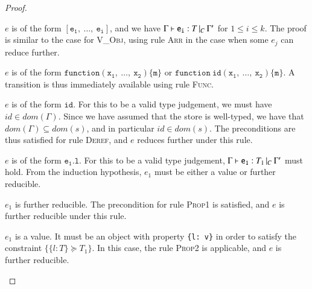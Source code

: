 \begin{proof}
  \begin{case}[V\_Arr]\label{case:prog-v_arr}

	$e$ is of the form $\mathtt{[e_1,\ \dots,\ e_i]}$, and we have $\Gamma{}\vdash\mathtt{e_i}: T\,|_C\:\Gamma'$ for $1 \leq i \leq k$.
	The proof is similar to the case for \textsc{V\_Obj}, using rule
	\textsc{Arr} in the case when some $e_j$ can reduce further.

  \end{case}

  \begin{case}\label{case:prog-fun}

	$e$ is of the form $\mathtt{function(x_1,\ \dots,\ x_2)\{m\}}$ or
	$\mathtt{function\ id(x_1,\ \dots,\ x_2)\{m\}}$. A transition is thus
	immediately available using rule \textsc{Func}.

  \end{case}

  \begin{case}[IDType]\label{case:prog-idtype}

	$e$ is of the form $\mathtt{id}$. For this to be a valid type judgement, we
	must have $id \in dom(\Gamma)$. Since we have assumed that the store is
	well-typed, we have that $dom(\Gamma) \subseteq dom(s)$, and in particular
	$id \in dom(s)$.  The preconditions are thus satisfied for rule
	\textsc{Deref}, and $e$ reduces further under this rule.

  \end{case}

  \begin{case}[PropType]\label{case:prog-proptype}

	$e$ is of the form $\mathtt{e_1.l}$. For this to be a valid type
	judgement, $\Gamma{}\vdash\mathtt{e_1}: T_1\,|_C\:\Gamma'$ must hold. From the induction
	hypothesis, $e_1$ must be either a value or further reducible.
	\begin{subcase}
	  $e_1$ is further reducible.
	  The precondition for rule \textsc{Prop1} is
	  satisfied, and $e$ is further reducible under this rule.
  	\end{subcase}
  	\begin{subcase}
  	  $e_1$ is a value.
  	  It must be an object with property \texttt{\{l: v\}}
	  in order to satisfy the constraint $\{\{l:T\}\succeq T_1\}$. In this case, the rule
	  \textsc{Prop2} is applicable, and $e$ is further reducible.
  	\end{subcase}
  \end{case}


\end{proof}
